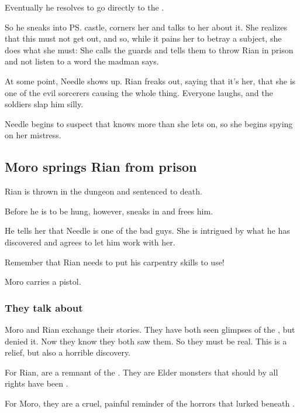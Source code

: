 Eventually he resolves to go directly to the \rinyuth. 

So he sneaks into \ps{\Tiroco} castle, corners her and talks to her about it. 
She realizes that this must not get out, and so, while it pains her to betray a subject, she does what she must: She calls the guards and tells them to throw Rian in prison and not listen to a word the madman says. 

At some point, Needle shows up. Rian freaks out, saying that it's her, that she is one of the evil sorcerers causing the whole thing. Everyone laughs, and the soldiers slap him silly. 

Needle begins to suspect that \Tiroco{} knows more than she lets on, so she begins spying on her mistress. 









\subsection{Moro springs Rian from prison}
Rian is thrown in the dungeon and sentenced to death. 

Before he is to be hung, however, \MoroCobrel{} sneaks in and frees him. 

He tells her that Needle is one of the bad guys. 
She is intrigued by what he has discovered and agrees to let him work with her. 

Remember that Rian needs to put his carpentry skills to use! 

Moro carries a pistol. 





\subsubsection{They talk about \quiljaaran}
Moro and Rian exchange their stories. 
They have both seen glimpses of the , but denied it.
Now they know they both saw them. 
So they must be real. 
This is a relief, but also a horrible discovery.

For Rian, \quiljaaran are a remnant of the .
They are Elder monsters that should by all rights have been . 

For Moro, they are a cruel, painful reminder of the horrors that lurked beneath \Yormis. 










